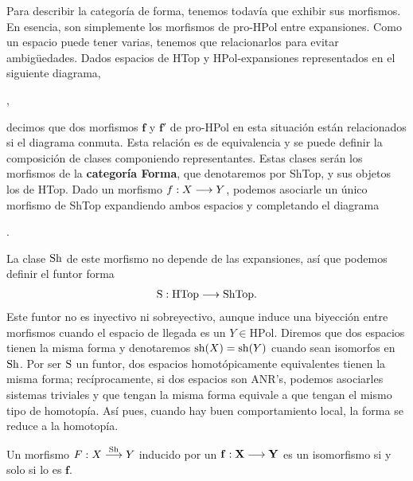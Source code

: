 Para describir la categoría de forma, tenemos todavía que exhibir sus morfismos. En esencia, son simplemente los morfismos de pro-HPol entre expansiones. Como un espacio puede tener varias, tenemos que relacionarlos para evitar ambig\"uedades. Dados espacios de HTop y HPol-expansiones representados en el siguiente diagrama,
\begin{center}
  ,
\end{center}
decimos que dos morfismos $ \mathbf{f}  $ y $ \mathbf{f}'  $ de pro-HPol en esta situación están relacionados si el diagrama conmuta. Esta relación es de equivalencia y se puede definir la composición de clases componiendo representantes. Estas clases serán los morfismos de la \textbf{categoría Forma}, que denotaremos por ShTop, y sus objetos los de HTop. Dado un morfismo $ f:X\longrightarrow Y  $, podemos asociarle un único morfismo de ShTop expandiendo ambos espacios y completando el diagrama 
\begin{center}
  .
\end{center}
La clase $ \operatorname{Sh}  $ de este morfismo no depende de las expansiones, así que podemos definir el funtor forma 
\begin{gather*}
  \operatorname{S}: \text{HTop}\longrightarrow \text{ShTop} .
\end{gather*}
Este funtor no es inyectivo ni sobreyectivo, aunque induce una biyección entre morfismos cuando el espacio de llegada es un $ Y \in \text{HPol} $. Diremos que dos espacios tienen la misma forma y denotaremos $ \operatorname{sh}(X) = \operatorname{sh}(Y) $ cuando sean isomorfos en $ \operatorname{Sh}  $. Por ser $ \operatorname{S}  $ un funtor, dos espacios homotópicamente equivalentes tienen la misma forma; recíprocamente, si dos espacios son ANR's, podemos asociarles sistemas triviales y que tengan la misma forma equivale a que tengan el mismo tipo de homotopía. Así pues, cuando hay buen comportamiento local, la forma se reduce a la homotopía.  
\begin{proposition}
    Un morfismo $ F:X\overset{\operatorname{Sh} }{\longrightarrow } Y $ inducido por un $ \mathbf{f}:\mathbf{X}\longrightarrow \mathbf{Y} $ es un isomorfismo si y solo si lo es $ \mathbf{f} $.
\end{proposition}

